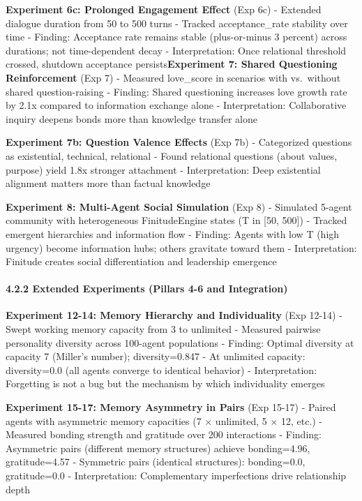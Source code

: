 \documentclass[
]{article}
\begin{document}
\textbf{Experiment 6c: Prolonged Engagement Effect} (Exp 6c) - Extended
dialogue duration from 50 to 500 turns - Tracked acceptance\_rate
stability over time - Finding: Acceptance rate remains stable
(plus-or-minus 3 percent) across durations; not time-dependent decay -
Interpretation: Once relational threshold crossed, shutdown acceptance
persists\textbf{Experiment 7: Shared Questioning Reinforcement} (Exp 7)
- Measured love\_score in scenarios with vs.~without shared
question-raising - Finding: Shared questioning increases love growth
rate by 2.1x compared to information exchange alone - Interpretation:
Collaborative inquiry deepens bonds more than knowledge transfer alone

\textbf{Experiment 7b: Question Valence Effects} (Exp 7b) - Categorized
questions as existential, technical, relational - Found relational
questions (about values, purpose) yield 1.8x stronger attachment -
Interpretation: Deep existential alignment matters more than factual
knowledge

\textbf{Experiment 8: Multi-Agent Social Simulation} (Exp 8) - Simulated
5-agent community with heterogeneous FinitudeEngine states (T in {[}50,
500{]}) - Tracked emergent hierarchies and information flow - Finding:
Agents with low T (high urgency) become information hubs; others
gravitate toward them - Interpretation: Finitude creates social
differentiation and leadership emergence

\hypertarget{extended-experiments-pillars-4-6-and-integration}{%
\paragraph{4.2.2 Extended Experiments (Pillars 4-6 and
Integration)}\label{extended-experiments-pillars-4-6-and-integration}}

\textbf{Experiment 12-14: Memory Hierarchy and Individuality} (Exp
12-14) - Swept working memory capacity from 3 to unlimited - Measured
pairwise personality diversity across 100-agent populations - Finding:
Optimal diversity at capacity 7 (Miller's number); diversity=0.847 - At
unlimited capacity: diversity=0.0 (all agents converge to identical
behavior) - Interpretation: Forgetting is not a bug but the mechanism by
which individuality emerges

\textbf{Experiment 15-17: Memory Asymmetry in Pairs} (Exp 15-17) -
Paired agents with asymmetric memory capacities (7 × unlimited, 5 × 12,
etc.) - Measured bonding strength and gratitude over 200 interactions -
Finding: Asymmetric pairs (different memory structures) achieve
bonding=4.96, gratitude=4.57 - Symmetric pairs (identical structures):
bonding=0.0, gratitude=0.0 - Interpretation: Complementary imperfections
drive relationship depth
\end{document}
